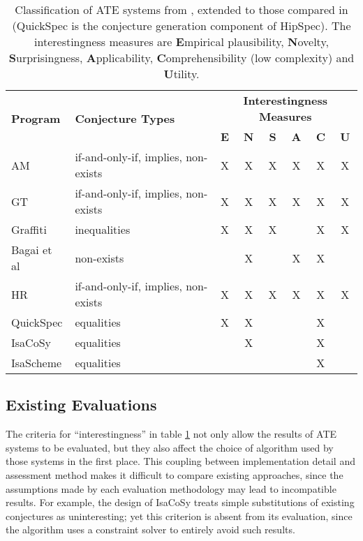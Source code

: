 \begin{table}
  \begin{center}
    \begin{tabular}{ |l|l|c|c|c|c|c|c| }
      \hline
      \multirow{2}{*}{\textbf{Program}}                 &
      \multirow{2}{*}{\textbf{Conjecture Types}}        &
      \multicolumn{6}{c}{\textbf{Interestingness Measures}} \\
      \hhline{~~------}
         & & \textbf{E} & \textbf{N} & \textbf{S} & \textbf{A} & \textbf{C} & \textbf{U} \\

      \hline
      AM          & if-and-only-if, implies, non-exists & X & X & X & X & X & X \\ \hline
      GT          & if-and-only-if, implies, non-exists & X & X & X & X & X & X \\ \hline
      Graffiti    & inequalities                        & X & X & X &   & X & X \\ \hline
      Bagai et al & non-exists                          &   & X &   & X & X &   \\ \hline
      HR          & if-and-only-if, implies, non-exists & X & X & X & X & X & X \\ \hline
      QuickSpec   & equalities                          & X & X &   &   & X &   \\ \hline
      IsaCoSy     & equalities                          &   & X &   &   & X &   \\ \hline
      IsaScheme   & equalities                          &   &   &   &   & X &   \\ \hline
    \end{tabular}
  \end{center}
  \caption{Classification of ATE systems from \cite{colton2000notion}, extended
    to those compared in \cite{claessen2013automating} (QuickSpec is the
    conjecture generation component of HipSpec). The interestingness measures
    are \textbf{E}mpirical plausibility, \textbf{N}ovelty,
    \textbf{S}urprisingness, \textbf{A}pplicability, \textbf{C}omprehensibility
    (low complexity) and \textbf{U}tility.}
  \label{table:colton}
\end{table}

\subsection{Existing Evaluations}
\label{sec:existing}

The criteria for ``interestingness'' in table \ref{table:colton} not only allow
the results of ATE systems to be evaluated, but they also affect the choice of
algorithm used by those systems in the first place. This coupling between
implementation detail and assessment method makes it difficult to compare
existing approaches, since the assumptions made by each evaluation methodology
may lead to incompatible results. For example, the design of IsaCoSy treats
simple substitutions of existing conjectures as uninteresting; yet this
criterion is absent from its evaluation, since the algorithm uses a constraint
solver to entirely avoid such results.

